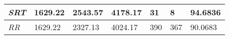 \documentclass{article}
\begin{document}
\begin{table}[h!]
\begin{tabular}{|l|l|l|l|l|l|l|}
  \textit{SRT}       & 1629.22                                                                          & 2543.57                                                                     & 4178.17                                                                            & 31                                                                                    & 8                                                                                   & 94.6836                                                                    \\ \hline
  \textit{RR}        & 1629.22                                                                          & 2327.13                                                                     & 4024.17                                                                            & 390                                                                                   & 367                                                                                 & 90.0683                                                                    \\ \hline
  \end{tabular}
\end{table}
\end{document}

